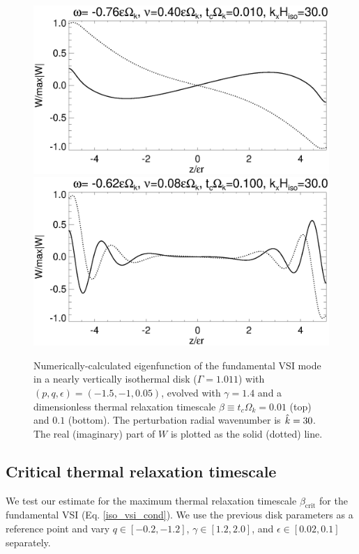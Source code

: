 \begin{figure}
  \includegraphics[width=\linewidth,clip=true,trim=0cm 1.75cm 0cm
  0cm]{figures/eigenvectorW_beta0d01} 
  \includegraphics[width=\linewidth,clip=true,trim=0cm 0cm 0cm
  0cm]{figures/eigenvectorW_beta0d1} 
  \caption{Numerically-calculated eigenfunction of the fundamental VSI
    mode in a nearly vertically isothermal disk ($\Gamma=1.011$) with
    $(p,q,\epsilon)=(-1.5,-1,0.05)$, evolved with $\gamma=1.4$ and a dimensionless 
    thermal relaxation timescale $\beta \equiv t_c\Omega_k = 0.01$
    (top) and $0.1$ (bottom). The
    perturbation radial wavenumber is $\hat{k}=30$. The
    real (imaginary) part of $W$ is plotted as the solid (dotted)
    line.
    \label{relax_eigenW_num}}  
\end{figure}

\subsection{Critical thermal relaxation timescale}
We test our estimate for the maximum thermal relaxation timescale 
$\beta_\mathrm{crit}$ for the fundamental
VSI (Eq. \ref{iso_vsi_cond}). We use the previous disk
parameters as a reference point and vary $q\in[-0.2,-1.2]$,
$\gamma\in[1.2,2.0]$, and $\epsilon\in[0.02,0.1]$
separately. 

